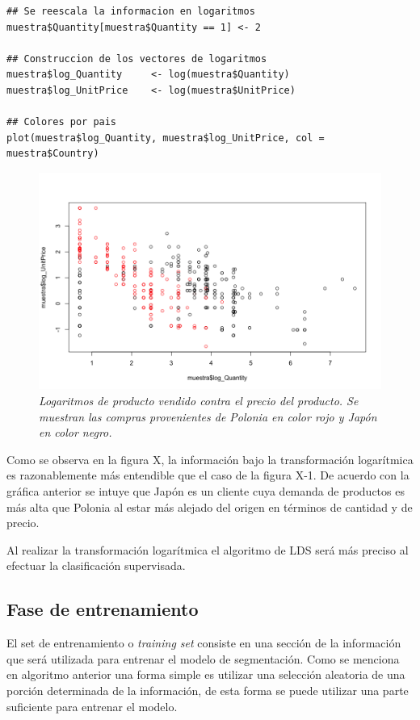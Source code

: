 \documentclass[letterpaper,12pt, spanish, oneside]{book} %
\begin{document}
\begin{lstlisting}
## Se reescala la informacion en logaritmos
muestra$Quantity[muestra$Quantity == 1] <- 2

## Construccion de los vectores de logaritmos
muestra$log_Quantity     <- log(muestra$Quantity)
muestra$log_UnitPrice    <- log(muestra$UnitPrice)

## Colores por pais
plot(muestra$log_Quantity, muestra$log_UnitPrice, col = muestra$Country)
\end{lstlisting}

\begin{figure}[H]
\centering
\includegraphics[width=1\textwidth]{marketing2.png}
\caption{\label{fig:frog2}\textit{Logaritmos de producto vendido contra el precio del producto. Se muestran las compras provenientes de Polonia en color rojo y Japón en color negro.}}
\end{figure}

Como se observa en la figura X, la información bajo la transformación logarítmica es razonablemente más entendible que el caso de la figura X-1. De acuerdo con la gráfica anterior se intuye que Japón es un cliente cuya demanda de productos es más alta que Polonia al estar más alejado del origen en términos de cantidad y de precio.

Al realizar la transformación logarítmica el algoritmo de LDS será más preciso al efectuar la clasificación supervisada. 

\subsection{Fase de entrenamiento}

El set de entrenamiento o \textit{training set} consiste en una sección de la información que será utilizada para entrenar el modelo de segmentación. Como se menciona en algoritmo anterior una forma simple es utilizar una selección aleatoria de una porción determinada de la información, de esta forma se puede utilizar una parte suficiente para entrenar el modelo.
\end{document}
